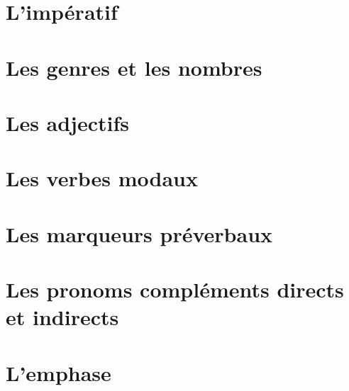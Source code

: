 \documentclass[draft]{book}
\begin{document}




\tableofcontents



















\chapter{L'impératif}

\chapter{Les genres et les nombres}

\chapter{Les adjectifs}



\chapter{Les verbes modaux}\label{VerbMod}

\chapter{Les marqueurs préverbaux}\label{MarqPVer}

\chapter{Les pronoms compléments directs et indirects} \label{PronCompl}

\chapter{L'emphase}\label{Emphase}
\end{document}
